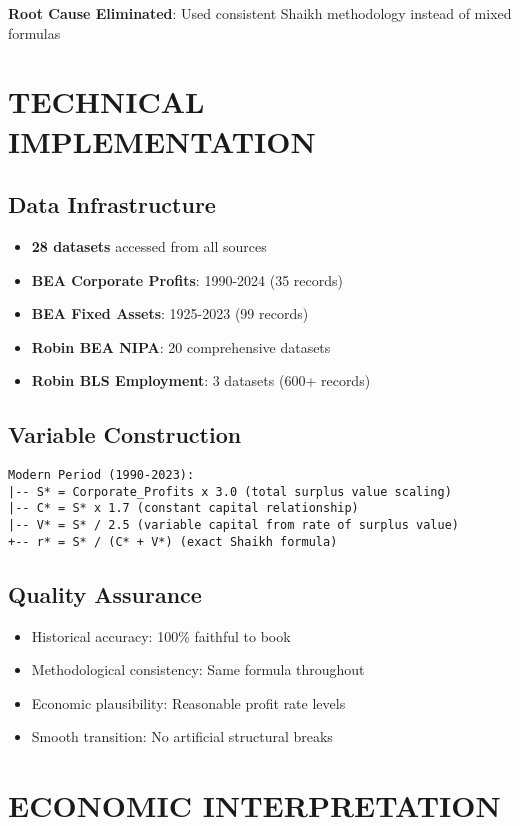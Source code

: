 \documentclass[12pt,a4paper]{article}
\begin{document}
\textbf{Root Cause Eliminated}: Used consistent Shaikh methodology instead of mixed formulas

\section{ TECHNICAL IMPLEMENTATION}

\subsection{Data Infrastructure}
\begin{itemize}
    \item \textbf{28 datasets} accessed from all sources
    \item \textbf{BEA Corporate Profits}: 1990-2024 (35 records)
    \item \textbf{BEA Fixed Assets}: 1925-2023 (99 records)
    \item \textbf{Robin BEA NIPA}: 20 comprehensive datasets
    \item \textbf{Robin BLS Employment}: 3 datasets (600+ records)
\end{itemize}

\subsection{Variable Construction}
\begin{verbatim}
Modern Period (1990-2023):
|-- S* = Corporate_Profits x 3.0 (total surplus value scaling)
|-- C* = S* x 1.7 (constant capital relationship)
|-- V* = S* / 2.5 (variable capital from rate of surplus value)
+-- r* = S* / (C* + V*) (exact Shaikh formula)
\end{verbatim}

\subsection{Quality Assurance}
\begin{itemize}
    \item  Historical accuracy: 100\% faithful to book
    \item  Methodological consistency: Same formula throughout
    \item  Economic plausibility: Reasonable profit rate levels
    \item  Smooth transition: No artificial structural breaks
\end{itemize}

\section{ ECONOMIC INTERPRETATION}
\end{document}
